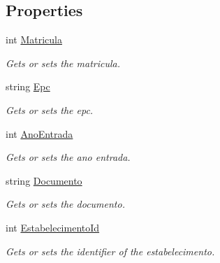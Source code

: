 \subsection*{Properties}
\begin{DoxyCompactItemize}
\item 
int \hyperlink{class_cruzeiro_1_1_core_1_1_model_1_1_beans_1_1_pessoa_bean_adf8f73610f0ba6ce684b83492d45156a}{Matricula}
\begin{DoxyCompactList}\small\item\em Gets or sets the matricula. \end{DoxyCompactList}\item 
string \hyperlink{class_cruzeiro_1_1_core_1_1_model_1_1_beans_1_1_pessoa_bean_a3e75bdd854ef96dae45ccda53240716e}{Epc}
\begin{DoxyCompactList}\small\item\em Gets or sets the epc. \end{DoxyCompactList}\item 
int \hyperlink{class_cruzeiro_1_1_core_1_1_model_1_1_beans_1_1_pessoa_bean_ad1885bcbe8c4a56a9cc6e516da61e5f4}{Ano\+Entrada}
\begin{DoxyCompactList}\small\item\em Gets or sets the ano entrada. \end{DoxyCompactList}\item 
string \hyperlink{class_cruzeiro_1_1_core_1_1_model_1_1_beans_1_1_pessoa_bean_a15d5831bce53d067066ca342a477a468}{Documento}
\begin{DoxyCompactList}\small\item\em Gets or sets the documento. \end{DoxyCompactList}\item 
int \hyperlink{class_cruzeiro_1_1_core_1_1_model_1_1_beans_1_1_pessoa_bean_a1914e359c48dd3e0f68b434332f29d5a}{Estabelecimento\+Id}
\begin{DoxyCompactList}\small\item\em Gets or sets the identifier of the estabelecimento. \end{DoxyCompactList}\item 

\end{DoxyCompactItemize}
